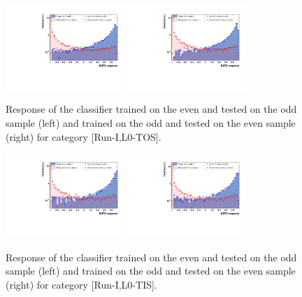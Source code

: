 \begin{figure}[h]
\centering
\includegraphics[height=!,width=0.4\textwidth]{figs/TMVA/BDTG_Data_run1_t0_even/overtrain_BDTG.pdf}
\includegraphics[height=!,width=0.4\textwidth]{figs/TMVA/BDTG_Data_run1_t0_odd/overtrain_BDTG.pdf}
\caption{Response of the classifier trained on the even and tested on the odd sample (left) and trained on the odd and tested on the even sample (right) for category [Run-I,\textsf{L0-TOS}].}

\includegraphics[height=!,width=0.4\textwidth]{figs/TMVA/BDTG_Data_run1_t1_even/overtrain_BDTG.pdf}
\includegraphics[height=!,width=0.4\textwidth]{figs/TMVA/BDTG_Data_run1_t1_odd/overtrain_BDTG.pdf}
\caption{Response of the classifier trained on the even and tested on the odd sample (left) and trained on the odd and tested on the even sample (right) for category [Run-I,\textsf{L0-TIS}].}


\end{figure}
